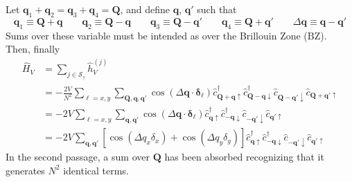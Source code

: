 Let $\mathbf{q}_1 + \mathbf{q}_2 = \mathbf{q}_3 + \mathbf{q}_4 = \mathbf{Q}$, and define $\mathbf{q}$, $\mathbf{q}'$ such that
\[
	\mathbf{q}_1 \equiv \mathbf{Q} + \mathbf{q} 
	\qquad
	\mathbf{q}_2 \equiv \mathbf{Q} - \mathbf{q} 
	\qquad
	\mathbf{q}_3 \equiv \mathbf{Q} - \mathbf{q}' 
	\qquad
	\mathbf{q}_4 \equiv \mathbf{Q} + \mathbf{q}'
	\qquad
	\Delta \mathbf{q} \equiv \mathbf{q}-\mathbf{q}'
\]
Sums over these variable must be intended as over the Brillouin Zone ($\mathrm{BZ}$). Then, finally
\[
\begin{aligned}
	\hat H_V &= \sum_{j \in \mathcal{S}_\uparrow} \hat h_V^{(j)} \\
	&= - \frac{2V}{N^2} \sum_{\ell = x,y} \sum_{\mathbf{Q}, \mathbf{q}, \mathbf{q}'} \cos\left(
		\Delta \mathbf{q} \cdot \bm{\delta}_\ell
	\right)	\hat c_{\mathbf{Q}+\mathbf{q} \uparrow}^\dagger \hat c_{\mathbf{Q}-\mathbf{q} \downarrow}^\dagger \hat c_{\mathbf{Q}-\mathbf{q}' \downarrow} \hat c_{\mathbf{Q}+\mathbf{q}'\uparrow} \\
	&= -2V \sum_{\ell = x,y} \sum_{\mathbf{q}, \mathbf{q}'} \cos\left(
	\Delta \mathbf{q} \cdot \bm{\delta}_\ell
	\right)	\hat c_{\mathbf{q} \uparrow}^\dagger \hat c_{-\mathbf{q} \downarrow}^\dagger \hat c_{-\mathbf{q}' \downarrow} \hat c_{\mathbf{q}'\uparrow} \\
	&= -2V \sum_{\mathbf{q}, \mathbf{q}'} 
	\left[
		\cos \left(
			\Delta q_x \delta_x
		\right)	+ \cos \left(
			\Delta q_y \delta_y
		\right)	
	\right]
	\hat c_{\mathbf{q} \uparrow}^\dagger \hat c_{-\mathbf{q} \downarrow}^\dagger \hat c_{-\mathbf{q}' \downarrow} \hat c_{\mathbf{q}'\uparrow}
\end{aligned}
\]
In the second passage, a sum over $\mathbf{Q}$ has been absorbed recognizing that it generates $N^2$ identical terms. \todo
